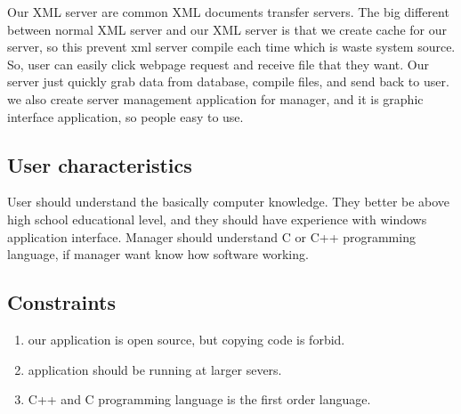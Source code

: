 Our XML server are common XML documents transfer servers.
The big different between normal XML server and our XML server is that we create cache for our server, so this prevent xml server compile each time which is waste system source.
So, user can easily click webpage request and receive file that they want.
Our server just quickly grab data from database, compile files, and send back to user.
we also create server management application for manager, and it is graphic interface application, so people easy to use.

\subsection{User characteristics}

User should understand the basically computer knowledge.
They better be above high school educational level, 
and they should have experience with windows application interface.
Manager should understand C or C++ programming language, if manager want know how software working.

\subsection{Constraints}
% 

\begin{enumerate}
  \item our application is open source, but copying code is forbid.
  \item application should be running at larger severs.
  \item C++ and C programming language is the first order language.
\end{enumerate}


